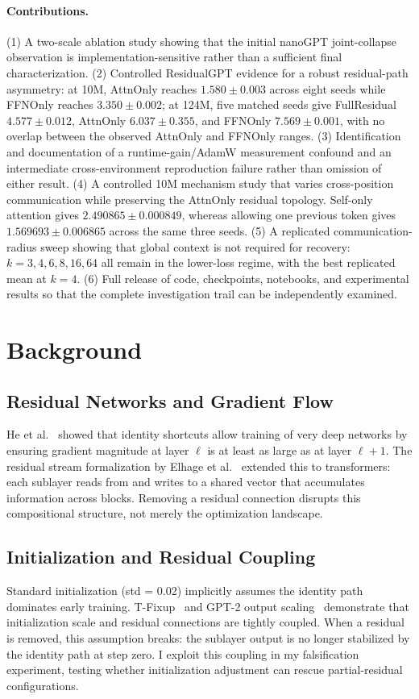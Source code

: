 \documentclass[11pt]{article}
\begin{document}
\paragraph{Contributions.}
(1) A two-scale ablation study showing that the initial nanoGPT joint-collapse observation is implementation-sensitive rather than a sufficient final characterization. (2) Controlled ResidualGPT evidence for a robust residual-path asymmetry: at 10M, AttnOnly reaches $1.580 \pm 0.003$ across eight seeds while FFNOnly reaches $3.350 \pm 0.002$; at 124M, five matched seeds give FullResidual $4.577 \pm 0.012$, AttnOnly $6.037 \pm 0.355$, and FFNOnly $7.569 \pm 0.001$, with no overlap between the observed AttnOnly and FFNOnly ranges. (3) Identification and documentation of a runtime-gain/AdamW measurement confound and an intermediate cross-environment reproduction failure rather than omission of either result. (4) A controlled 10M mechanism study that varies cross-position communication while preserving the AttnOnly residual topology. Self-only attention gives $2.490865 \pm 0.000849$, whereas allowing one previous token gives $1.569693 \pm 0.006865$ across the same three seeds. (5) A replicated communication-radius sweep showing that global context is not required for recovery: $k=3,4,6,8,16,64$ all remain in the lower-loss regime, with the best replicated mean at $k=4$. (6) Full release of code, checkpoints, notebooks, and experimental results so that the complete investigation trail can be independently examined.

\section{Background}
\subsection{Residual Networks and Gradient Flow}
He et al.~\cite{he2016deep} showed that identity shortcuts allow training of very deep networks by ensuring gradient magnitude at layer $\ell$ is at least as large as at layer $\ell+1$. The residual stream formalization by Elhage et al.~\cite{elhage2021framework} extended this to transformers: each sublayer reads from and writes to a shared vector that accumulates information across blocks. Removing a residual connection disrupts this compositional structure, not merely the optimization landscape.

\subsection{Initialization and Residual Coupling}
Standard initialization (std = 0.02) implicitly assumes the identity path dominates early training. T-Fixup~\cite{huang2020improving} and GPT-2 output scaling~\cite{radford2019language} demonstrate that initialization scale and residual connections are tightly coupled. When a residual is removed, this assumption breaks: the sublayer output is no longer stabilized by the identity path at step zero. I exploit this coupling in my falsification experiment, testing whether initialization adjustment can rescue partial-residual configurations.
\end{document}
